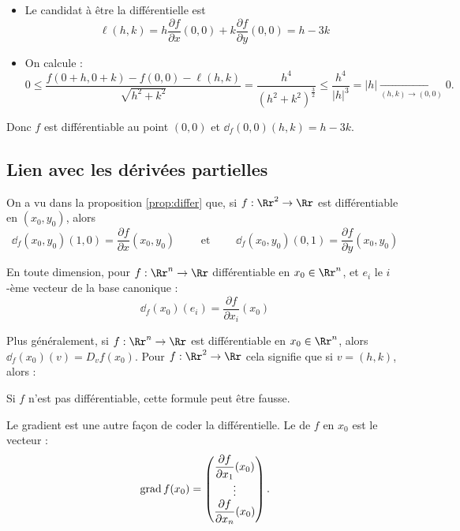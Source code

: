 \documentclass[12pt, class=report,crop=false]{standalone}
\begin{document}
{\begin{exemple}
\begin{itemize}
\begin{itemize}
    \item Le candidat à être la différentielle est
$$\ell(h,k) = 
h \frac{\partial f}{\partial x}(0,0) + 
k \frac{\partial f}{\partial y}(0,0)
= h-3k$$

    \item On calcule :
$$0 \le \frac{f(0+h,0+k) - f(0,0) - \ell(h,k)}{\sqrt{h^2+k^2}}
=  \frac{h^4}{(h^2+k^2)^{\frac{3}{2}}}
\le \frac{h^4}{|h|^3}
=|h|
\underset{(h,k)\to(0,0)}{\longrightarrow} 0
.$$    
    
  \end{itemize}
    
Donc $f$ est différentiable au point $(0,0)$ et $\dd_f (0,0)(h,k) = h-3k$.
  
\end{itemize}

\end{exemple}

\subsection{Lien avec les dérivées partielles}


\bigskip
{}

On a vu dans la proposition \ref{prop:differ} que, si $f : \Rr^2 \to \Rr$ est différentiable en $(x_0,y_0)$, alors
$$\dd_f (x_0,y_0) (1,0) = \frac{\partial f}{\partial x}(x_0,y_0)
\qquad \text{ et } \qquad
\dd_f (x_0,y_0) (0,1) = \frac{\partial f}{\partial y}(x_0,y_0)$$

En toute dimension, pour $f : \Rr^n \to \Rr$ différentiable en $x_0 \in \Rr^n$, et $e_i$ le $i$-ème vecteur de la base canonique :
$$\dd_f (x_0) (e_i) = \frac{\partial f}{\partial x_i}(x_0)$$



\bigskip
{}

Plus généralement, si $f : \Rr^n \to \Rr$ est différentiable en $x_0 \in \Rr^n$, alors $\dd_f (x_0) (v) = D_v f(x_0)$.
Pour $f : \Rr^2 \to \Rr$ cela signifie que si $v=(h,k)$, alors :

Si $f$ n'est pas différentiable, cette formule peut être fausse.

\bigskip
{}

Le gradient est une autre façon de coder la différentielle.
Le  de $f$ en $x_0$ est le vecteur :
$$\operatorname{grad} f (x_0) =
\begin{pmatrix}
\dfrac{\partial f}{\partial x_{1}} (x_0)\\
\vdots \\
\dfrac{\partial f}{\partial x_n}(x_0)
\end{pmatrix}.$$

}
\end{document}

